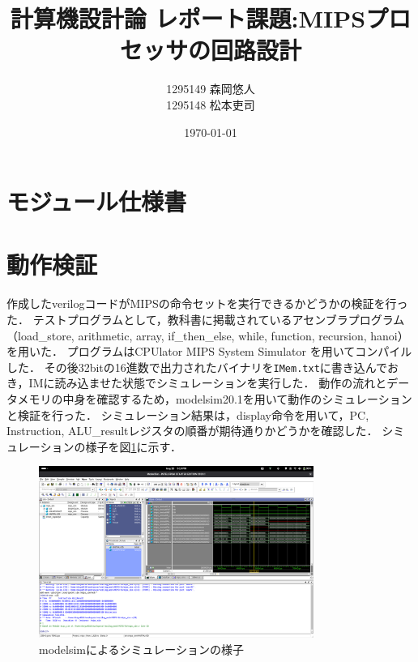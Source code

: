 \documentclass[dvipdfmx]{jsarticle}
\title{計算機設計論 レポート課題:MIPSプロセッサの回路設計}
\author{1295149 森岡悠人\\ 1295148 松本吏司}
\date{\today}
\begin{document}
\maketitle

\section{モジュール仕様書}





\section{動作検証}
作成したverilogコードがMIPSの命令セットを実行できるかどうかの検証を行った．
テストプログラムとして，教科書\cite{textbook}に掲載されているアセンブラプログラム（load\_store, arithmetic, array, if\_then\_else, while, function, recursion, hanoi）を用いた．
プログラムはCPUlator MIPS System Simulator \cite{mips-sim}を用いてコンパイルした．
その後32bitの16進数で出力されたバイナリを\texttt{IMem.txt}に書き込んでおき，IMに読み込ませた状態でシミュレーションを実行した．
動作の流れとデータメモリの中身を確認するため，modelsim20.1を用いて動作のシミュレーションと検証を行った．
シミュレーション結果は，display命令を用いて，PC, Instruction, ALU\_resultレジスタの順番が期待通りかどうかを確認した．
シミュレーションの様子を図\ref{fig:simulation}に示す．
\begin{figure}[h]
\centering
  \includegraphics[width=0.8\textwidth]{modelsim.png}
  \caption{modelsimによるシミュレーションの様子}
  \label{fig:simulation}
\end{figure}
\end{document}
